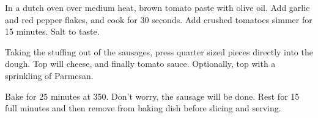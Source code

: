 \begin{recipe}
In a dutch oven over medium heat, brown tomato paste with olive oil. Add garlic and red pepper flakes, and cook for 30 seconds. Add crushed tomatoes simmer for 15 minutes. Salt to taste.


Taking the stuffing out of the sausages, press quarter sized pieces directly into the dough. Top will cheese, and finally tomato sauce. Optionally, top with a sprinkling of Parmesan.

Bake for 25 minutes at 350. Don't worry, the sausage will be done. Rest for 15 full minutes and then remove from baking dish before slicing and serving.


\end{recipe}
